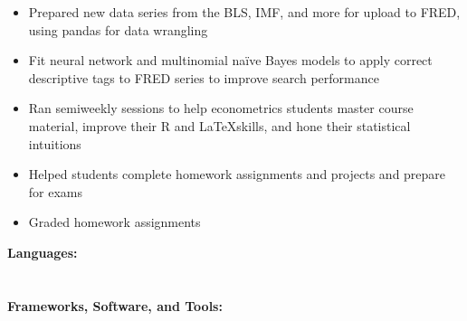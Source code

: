 \documentclass[10pt,a4paper,ragged2e,withhyper]{/Users/matt/Google Drive/GitHub/mrkaye97.github.io/resume/altacv}
\begin{document}
\begin{paracol}{2}
		\divider
		
		\begin{itemize}
			\item Prepared new data series from the BLS, IMF, and more for upload to FRED, using pandas for data wrangling
			\item Fit neural network and multinomial naïve Bayes models to apply correct descriptive tags to FRED series to improve search performance
		\end{itemize}
		
		\divider
		
		\begin{itemize}
			\item Ran semiweekly sessions to help econometrics students master course material, improve their R and \LaTeX \space skills, and hone their statistical intuitions
			\item Helped students complete homework assignments and projects and prepare for exams
			\item Graded homework assignments
		\end{itemize}
		
		
%		
%		
%		
%		
		
		\switchcolumn
		\smallskip
		\textbf{Languages:}\\
		\smallskip
		\\
		
		
		\divider\smallskip\\
		\textbf{Frameworks, Software, and Tools:}\\
		\smallskip\\
		\smallskip\\
		
		\\
		\\
		\\
		\\
		

\end{paracol}
\end{document}
